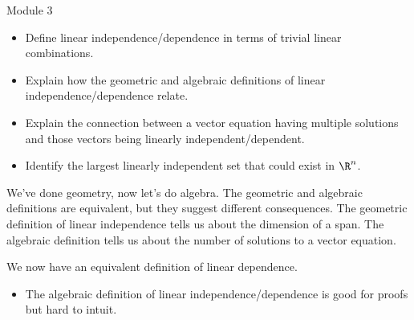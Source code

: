 \begin{lesson}

	Module 3

	\begin{itemize}
		\item Define linear independence/dependence in terms of trivial linear combinations.
		\item Explain how the geometric and algebraic definitions of linear independence/dependence relate.
		\item Explain the connection between a vector equation having multiple
			solutions and those vectors being linearly independent/dependent.
		\item Identify the largest linearly independent set that could exist in $\R^n$.
	\end{itemize}

	We've done geometry, now let's do algebra. The geometric and algebraic definitions
	are equivalent, but they suggest different consequences. The geometric definition
	of linear independence tells us about the dimension of a span. The algebraic
	definition tells us about the number of solutions to a vector equation.

\end{lesson}

	We now have an equivalent definition of linear dependence.
	\begin{annotation}
		\begin{notes}
			\begin{itemize}
				\item The algebraic definition of linear independence/dependence
					is good for proofs but hard to intuit.
			\end{itemize}
		\end{notes}
	\end{annotation}

	\bookonlynewpage

